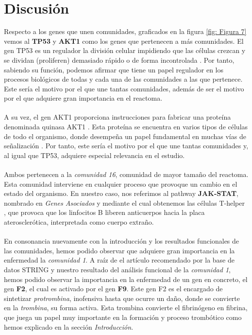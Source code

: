 \section{Discusión}
\hfill


\hfill

Respecto a los genes que unen comunidades, graficados en la figura \ref*{fig: Figura 7} vemos al \textbf{TP53} y \textbf{AKT1} como los genes que pertenecen a más comunidades. El gen TP53 es un regulador la división celular impidiendo que las células crezcan y se dividan (proliferen) demasiado rápido o de forma incontrolada \cite{TP53}. Por tanto, sabiendo su función, podemos afirmar que tiene un papel regulador en los procesos biológicos de todas y cada una de las comunidades a las que pertenece. Este sería el motivo por el que une tantas comunidades, además de ser el motivo por el que adquiere gran importancia en el reactoma.\\\\  A su vez, el gen AKT1 proporciona instrucciones para fabricar una proteína denominada quinasa AKT1 \cite{AKT1}. Esta proteína se encuentra en varios tipos de células de todo el organismo, donde desempeña un papel fundamental en muchas vías de señalización \cite{AKT1}. Por tanto, este sería el motivo por el que une tantas comunidades y, al igual que TP53, adquiere especial relevancia en el estudio.\\\\
Ambos pertenecen a la \textit{comunidad 16}, comunidad de mayor tamaño del reactoma. Esta comunidad interviene en cualquier proceso que provoque un cambio en el estado del organismo. En nuestro caso, nos referimos al pathway \textbf{JAK-STAT}, nombrado en \textit{Genes Asociados} y mediante el cual obtenemos las células T-helper \cite{pathway}, que provoca que los linfocitos B liberen anticuerpos hacia la placa aterosclerótica, interpretada como cuerpo extraño.\\\\
En consonancia nuevamente con la introducción y los resultados funcionales de las comunidades, hemos podido observar que adquiere gran importancia en la enfermedad la \textit{comunidad 1}. A raíz de el artículo recomendado \cite{F2_F9} por la base de datos STRING \cite{STRING}  y nuestro resultado del análisis funcional de la \textit{comunidad 1}, hemos podido observar la importancia en la enfermedad de un gen en concreto, el gen \textbf{F2}, el cual es activado por el gen \textbf{F9}. Este gen F2 es el encargado de sintetizar \textit{protrombina}, inofensiva hasta que ocurre un daño, donde se convierte en la \textit{trombina}, su forma activa. Esta trombina convierte el fibrinógeno en fibrina, que juega un papel muy importante en la formación y proceso trombótico como hemos explicado en la sección \textit{Introducción}.
